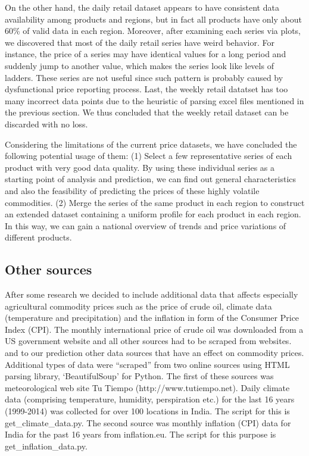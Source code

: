 On the other hand, the daily retail dataset appears to have consistent data availability among products and regions, but in fact all products have only about 60\% of valid data in each region. Moreover, after examining each series via plots, we discovered that most of the daily retail series have weird behavior. For instance, the price of a series may have identical values for a long period and suddenly jump to another value, which makes the series look like levels of ladders. These series are not useful since such pattern is probably caused by dysfunctional price reporting process. Last, the weekly retail datatset has too many incorrect data points due to the heuristic of parsing excel files mentioned in the previous section. We thus concluded that the weekly retail dataset can be discarded with no loss.

Considering the limitations of the current price datasets, we have concluded the following potential usage of them: (1) Select a few representative series of each product with very good data quality. By using these individual series as a starting point of analysis and prediction, we can find out general characteristics and also the feasibility of predicting the prices of these highly volatile commodities. (2) Merge the series of the same product in each region to construct an extended dataset containing a uniform profile for each product in each region. In this way, we can gain a national overview of trends and price variations of different products.

\subsection*{Other sources}
After some research we decided to include additional data that affects especially agricultural commodity prices such as the price of crude oil, climate data (temperature and precipitation) and the inflation in form of the Consumer Price Index (CPI). The monthly international price of crude oil  was downloaded from a US government website and all other sources had to be scraped from websites.  and  to our prediction other data sources that have an effect on commodity prices.
Additional types of data were ``scraped'' from two online sources using HTML parsing library, `BeautifulSoup' for Python. The first of these sources was meteorological web site Tu Tiempo (http://www.tutiempo.net). Daily climate data (comprising temperature, humidity, perspiration etc.) for the last 16 years (1999-2014) was collected for over 100 locations in India. The script for this is get\_climate\_data.py. The second source was monthly inflation (CPI) data for India for the past 16 years from inflation.eu. The script for this purpose is get\_inflation\_data.py.

